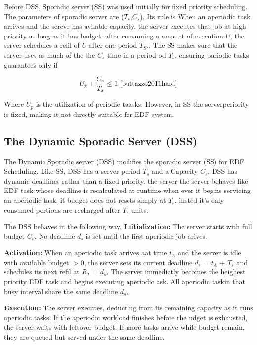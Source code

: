 \documentclass[conference]{IEEEtran}
\begin{document}
Before DSS, Sporadic server (SS) was used initially for fixed priority scheduling\cite{buttazzo2011hard}. The parameters of sporadic server are ($T_s$,$C_s$), Its rule is When an aperiodic task arrives and the serevr has avilable capacity, the server executes that job at high priority as long as it has budget. after consuming a amount of execution $U$, the server schedules a refil of $U$ after one period $T_S$\cite{buttazzo2011hard}.. The SS makes sure that the server uses as much of the the $C_s$ time in a period od $T_s$, ensuring pariodic tasks guarantees only if\cite{buttazzo2011hard}

\[
U_p + \frac{C_s}{T_s} \leq 1
\ \cite{buttazzo2011hard} \]

Where $U_p$ is the utilization of periodic taasks. However, in SS the serverperiority is fixed, making it not directly suitable for EDF system\cite{buttazzo2011hard}.

\subsection{The Dynamic Sporadic Server (DSS)}
The Dynamic Sporadic server (DSS) modifies the sporadic server (SS) for EDF Scheduling\cite{spuri1994efficient}.
Like SS, DSS has a server period $T_s$ and a Capacity $C_s$, DSS has dynamic deadlines rather than a fixed priority. the server the server behaves like EDF task whose deadline is recalculated at runtime when ever it begins servicing an aperiodic task. it budget does not resets simply at $T_s$, insted it's only consumed portions are recharged after $T_s$ units\cite{spuri1994efficient,buttazzo2011hard}.

The DSS behaves in the following way,
\textbf{Initialization:} The server starts with full budget $C_s$. No deadline $d_s$ is set until the first aperiodic job arives\cite{spuri1994efficient,buttazzo2011hard}.

\textbf{Activation:} When an aperiodic task arrives aat time $t_A$ and the server is idle with available budget $>0$, the server sets its current deadline $d_s$ = $t_A$ + $T_s$\cite{spuri1994efficient} and schedules its next refil at $R_T$ = $d_s$\cite{spuri1994efficient}. The server immediatly becomes the heighest priority EDF task and begins executing aperiodic ask. All aperiodic taskin that busy interval share the same deadline $d_s$\cite{spuri1994efficient}.

\textbf{Execution:} The server executes, deducting from its remaining capacity as it runs aperiodic tasks. If the aperiodic workload finishes before the udget is exhausted, the server waits with leftover budget. If more tasks arrive while budget remain, they are queued but served under the same deadline\cite{spuri1994efficient}. 
\end{document}
